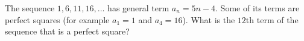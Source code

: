 The sequence $1,6,11,16,\dots$ has general term $a_n=5n-4$. Some of its terms are perfect squares (for example $a_1=1$ and $a_4=16$). What is the $12$th term of the sequence that is a perfect square?

